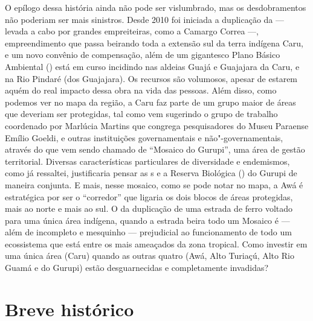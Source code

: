 O epílogo dessa história ainda não pode ser vislumbrado, mas os
desdobramentos não poderiam ser mais sinistros. Desde 2010 foi iniciada
a duplicação da  --- levada a cabo por grandes empreiteiras, como a
Camargo Correa ---, empreendimento que passa beirando toda a extensão sul
da terra indígena Caru, e um novo convênio de compensação, além de um
gigantesco Plano Básico Ambiental () está em curso incidindo nas
aldeias Guajá e Guajajara da  Caru, e na  Rio Pindaré (dos
Guajajara). Os recursos são volumosos, apesar de estarem aquém do real
impacto dessa obra na vida das pessoas. Além disso, como podemos ver no
mapa da região, a  Caru faz parte de um grupo maior de áreas que
deveriam ser protegidas, tal como vem sugerindo o grupo de trabalho
coordenado por Marlúcia Martins que congrega pesquisadores do Museu
Paraense Emílio Goeldi, e outras instituições governamentais e
não"-governamentais, através do que vem sendo chamado de ``Mosaico do
Gurupi'', uma área de gestão territorial. Diversas características
particulares de diversidade e endemismos, como já ressaltei,
justificaria pensar as s e a Reserva Biológica () do Gurupi de
maneira conjunta. E mais, nesse mosaico, como se pode notar no mapa, a
 Awá é estratégica por ser o ``corredor'' que ligaria os dois blocos
de áreas protegidas, mais ao norte e mais ao sul. O  da duplicação de
uma estrada de ferro voltado para uma única área indígena, quando a
estrada beira todo um Mosaico é --- além de incompleto e mesquinho ---
prejudicial ao funcionamento de todo um ecossistema que está entre os
mais ameaçados da zona tropical. Como investir em uma única área (Caru)
quando as outras quatro (Awá, Alto Turiaçú, Alto Rio Guamá e  do
Gurupi) estão desguarnecidas e completamente invadidas?

\section{Breve histórico }\label{breve-histuxf3rico}

